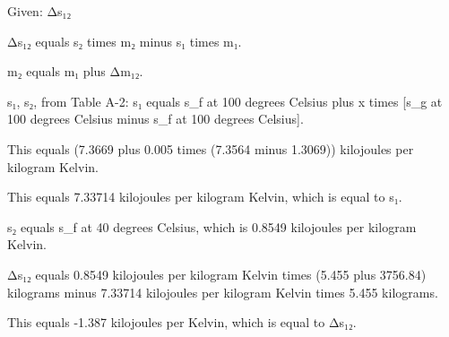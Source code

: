 Given: Δs₁₂

Δs₁₂ equals s₂ times m₂ minus s₁ times m₁.

m₂ equals m₁ plus Δm₁₂.

s₁, s₂, from Table A-2: s₁ equals s_f at 100 degrees Celsius plus x times [s_g at 100 degrees Celsius minus s_f at 100 degrees Celsius].

This equals (7.3669 plus 0.005 times (7.3564 minus 1.3069)) kilojoules per kilogram Kelvin.

This equals 7.33714 kilojoules per kilogram Kelvin, which is equal to s₁.

s₂ equals s_f at 40 degrees Celsius, which is 0.8549 kilojoules per kilogram Kelvin.

Δs₁₂ equals 0.8549 kilojoules per kilogram Kelvin times (5.455 plus 3756.84) kilograms minus 7.33714 kilojoules per kilogram Kelvin times 5.455 kilograms.

This equals -1.387 kilojoules per Kelvin, which is equal to Δs₁₂.